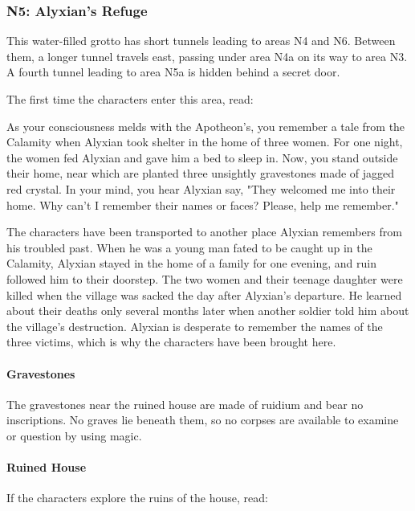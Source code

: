 \documentclass[a4paper, 11pt, bg=full, twocolumn, nooutline]{dndbook}
\begin{document}
\subsubsection{N5: Alyxian's Refuge}

This water-filled grotto has short tunnels leading to areas N4 and N6. Between them, a longer tunnel travels east, passing under area N4a on its way to area N3. A fourth tunnel leading to area N5a is hidden behind a secret door.

The first time the characters enter this area, read:

\begin{DndReadAloud}
As your consciousness melds with the Apotheon's, you remember a tale from the Calamity when Alyxian took shelter in the home of three women. For one night, the women fed Alyxian and gave him a bed to sleep in. Now, you stand outside their home, near which are planted three unsightly gravestones made of jagged red crystal.
In your mind, you hear Alyxian say, "They welcomed me into their home. Why can't I remember their names or faces? Please, help me remember."
\end{DndReadAloud}

The characters have been transported to another place Alyxian remembers from his troubled past. When he was a young man fated to be caught up in the Calamity, Alyxian stayed in the home of a family for one evening, and ruin followed him to their doorstep. The two women and their teenage daughter were killed when the village was sacked the day after Alyxian's departure. He learned about their deaths only several months later when another soldier told him about the village's destruction. Alyxian is desperate to remember the names of the three victims, which is why the characters have been brought here.

\paragraph{Gravestones}

The gravestones near the ruined house are made of ruidium and bear no inscriptions. No graves lie beneath them, so no corpses are available to examine or question by using magic.

\paragraph{Ruined House}

If the characters explore the ruins of the house, read:
\end{document}
